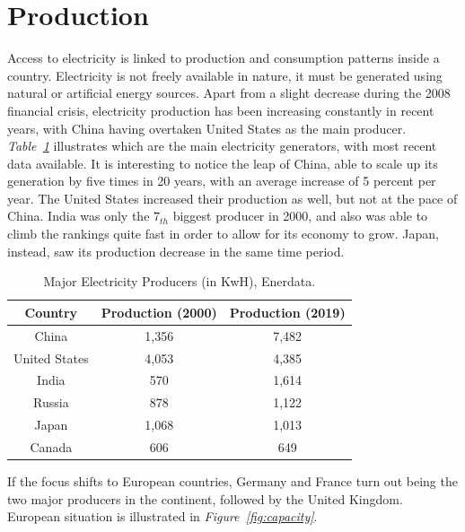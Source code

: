 \documentclass[a4paper,12pt]{book}
\begin{document}
\section{Production}

Access to electricity is linked to production and consumption patterns inside a country. Electricity is not freely available in nature, it must be generated using natural or artificial energy sources. Apart from a slight decrease during the 2008 financial crisis, electricity production has been increasing constantly in recent years, with China having overtaken United States as the main producer.\\

\textit{Table~\ref{Tab:enerdata}} illustrates which are the main electricity generators, with most recent data available. It is interesting to notice the leap of China, able to scale up its generation by five times in 20 years, with an average increase of 5 percent per year. The United States increased their production as well, but not at the pace of China. India was only the $7_{th}$ biggest producer in 2000, and also was able to climb the rankings quite fast in order to allow for its economy to grow. Japan, instead, saw its production decrease in the same time period.

\begin{table}[tb]
\begin{center}
\begin{tabular}{|c|c|c|}
\hline
Country & Production (2000) & Production (2019)\\
\hline
China & 1,356 & 7,482\\
United States & 4,053 & 4,385\\
India & 570 & 1,614\\
Russia & 878 & 1,122\\
Japan & 1,068 & 1,013\\
Canada & 606 & 649\\
\hline
\end{tabular}
\caption{Major Electricity Producers (in KwH), Enerdata.}
\label{Tab:enerdata}
\end{center}
\end{table}

If the focus shifts to European countries, Germany and France turn out being the two major producers in the continent, followed by the United Kingdom. European situation is illustrated in \textit{Figure~\ref{fig:capacity}}.
\end{document}
